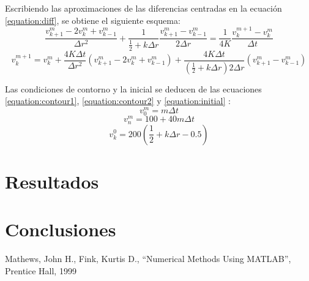 \documentclass[journal, monochrome]{IEEEtran}
\begin{document}
Escribiendo las aproximaciones de las diferencias centradas en la ecuación \eqref{equation:diff}, se obtiene el siguiente esquema: \\
\begin{equation}
\frac{v_{k+1}^{m} - 2v_{k}^{m} + v_{k-1}^{m}}{\Delta r^{2}} + \frac{1}{\frac{1}{2}+k\Delta r} \frac{v_{k+1}^{m}-v_{k-1}^{m}}{2\Delta r} = \frac{1}{4K} \frac{v_{k}^{m+1} - v_{k}^{m}}{\Delta t}
\end{equation}
\begin{equation}
v_{k}^{m+1} = v_{k}^{m} + \frac{4K\Delta t}{\Delta r^{2}} (v_{k+1}^{m} - 2v_{k}^{m} + v_{k-1}^{m}) + \frac{4K\Delta t}{(\frac{1}{2}+k\Delta r)2\Delta r} (v_{k+1}^{m}-v_{k-1}^{m})
\label{equation:diffapprox}
\end{equation}

Las condiciones de contorno y la inicial se deducen de las ecuaciones \eqref{equation:contour1}, \eqref{equation:contour2} y \eqref{equation:initial} :
\begin{equation}
v_{0}^{m} = m\Delta t 
\end{equation}
\begin{equation}
v_{n}^{m} = 100 + 40m\Delta t 
\end{equation}
\begin{equation}
v_{k}^{0} = 200(\frac{1}{2}+k\Delta r - 0.5) 
\end{equation}






\vspace{1cm}
\section{Resultados}
\label{section:results}
\vspace{0.5cm}



\vspace{1cm}
\section{Conclusiones}
\label{section:conclusions}
\vspace{0.5cm}




\vspace{1cm}
\begin{thebibliography}{1}
	Mathews, John H.,
	Fink, Kurtis D.,
	``Numerical Methods Using MATLAB'',
	Prentice Hall,
	1999
	
\end{thebibliography}
\end{document}
